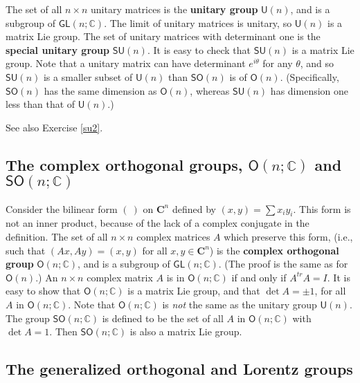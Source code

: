 \documentclass[12pt]{amsbook}
\theoremstyle{plain}
\numberwithin{equation}{chapter}
\numberwithin{theorem}{chapter}
\begin{document}
The set of all $n\times n$ unitary matrices is the \textbf{unitary group}
$\mathsf{U}(n)$, and is a subgroup of $\mathsf{GL}(n;\mathbb{C})$. The limit
of unitary matrices is unitary, so $\mathsf{U}(n)$ is a matrix Lie group. The
set of unitary matrices with determinant one is the \textbf{special unitary
group} $\mathsf{SU}(n)$. It is easy to check that $\mathsf{SU}(n)$ is a matrix
Lie group. Note that a unitary matrix can have determinant $e^{i\theta}$ for
any $\theta$, and so $\mathsf{SU}(n)$ is a smaller subset of $\mathsf{U}(n)$
than $\mathsf{SO}(n)$ is of $\mathsf{O}(n)$. (Specifically, $\mathsf{SO}(n)$
has the same dimension as $\mathsf{O}(n)$, whereas $\mathsf{SU}(n)$ has
dimension one less than that of $\mathsf{U}(n)$.)

See also Exercise \ref{su2}.

\subsection{The complex orthogonal groups, $\mathsf{O}(n;\mathbb{C})$ and
$\mathsf{SO}(n;\mathbb{C})$}

Consider the bilinear form $\left(  \ \right)  $ on $\mathbf{C}^{n}$ defined
by $(x,y)=\sum x_{i}y_{i}$. This form is not an inner product, because of the
lack of a complex conjugate in the definition. The set of all $n\times n$
complex matrices $A$ which preserve this form, (i.e., such that
$(Ax,Ay)=(x,y)$ for all $x,y\in\mathbf{C}^{n}$) is the \textbf{complex
orthogonal group} $\mathsf{O}(n;\mathbb{C})$, and is a subgroup of
$\mathsf{GL}(n;\mathbb{C})$. (The proof is the same as for $\mathsf{O}(n)$.)
An $n\times n$ complex matrix $A$ is in $\mathsf{O}(n;\mathbb{C})$ if and only
if $A^{tr}A=I$. It is easy to show that $\mathsf{O}(n;\mathbb{C})$ is a matrix
Lie group, and that $\det A=\pm1$, for all $A$ in $\mathsf{O}(n;\mathbb{C})$.
Note that $\mathsf{O}(n;\mathbb{C})$ is \textit{not} the same as the unitary
group $\mathsf{U}(n)$. The group $\mathsf{SO}(n;\mathbb{C})$ is defined to be
the set of all $A$ in $\mathsf{O}(n;\mathbb{C})$ with $\det A=1$. Then
$\mathsf{SO}(n;\mathbb{C})$ is also a matrix Lie group.

\subsection{The generalized orthogonal and Lorentz groups}
\end{document}

